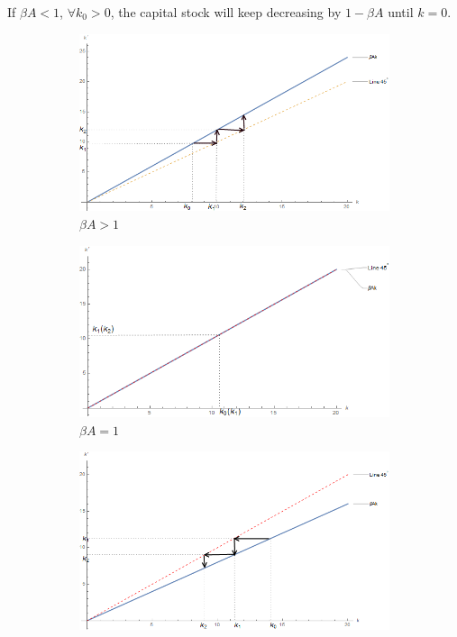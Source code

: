 \documentclass{article}
\begin{document}
\begin{enumerate}
\begin{enumerate}
            If $\beta A<1$, $\forall k_0>0$, the capital stock will keep decreasing by $1-\beta A$ until $k=0$.
            \begin{figure}[h!]
                \centering
                \begin{subfigure}[b]{.8\linewidth}
                  \includegraphics[width=\linewidth]{5_1d1.png}
                   \caption{$\beta A>1$}
                \end{subfigure}
                \begin{subfigure}[b]{.8\linewidth}
                  \includegraphics[width=\linewidth]{5_1d2.png}
                  \caption{$\beta A=1$}
                \end{subfigure}
                \begin{subfigure}[b]{.8\linewidth}
                  \includegraphics[width=\linewidth]{5_1d3.png}

\end{subfigure}
\end{figure}
\end{enumerate}
\end{enumerate}
\end{document}

